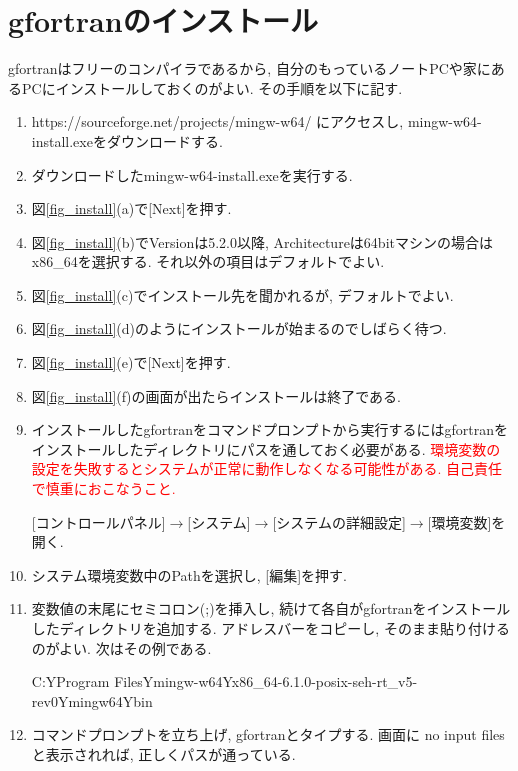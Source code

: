 \appendix
\section{gfortranのインストール}
gfortranはフリーのコンパイラであるから, 
自分のもっているノートPCや家にあるPCにインストールしておくのがよい. 
その手順を以下に記す. 

\begin{enumerate}
\item https://sourceforge.net/projects/mingw-w64/ にアクセスし, mingw-w64-install.exeをダウンロードする. 
\item ダウンロードしたmingw-w64-install.exeを実行する. 
\item 図\ref{fig_install}(a)で[Next]を押す. 
\item 図\ref{fig_install}(b)でVersionは5.2.0以降, Architectureは64bitマシンの場合はx86\_64を選択する. それ以外の項目はデフォルトでよい. 
\item 図\ref{fig_install}(c)でインストール先を聞かれるが, デフォルトでよい. 
\item 図\ref{fig_install}(d)のようにインストールが始まるのでしばらく待つ.  
\item 図\ref{fig_install}(e)で[Next]を押す. 
\item 図\ref{fig_install}(f)の画面が出たらインストールは終了である. 
\item インストールしたgfortranをコマンドプロンプトから実行するにはgfortranをインストールしたディレクトリにパスを通しておく必要がある.
\textcolor{red}{環境変数の設定を失敗するとシステムが正常に動作しなくなる可能性がある. 自己責任で慎重におこなうこと. }

[コントロールパネル]$\to$[システム]$\to$[システムの詳細設定]$\to$[環境変数]を開く. 
\item システム環境変数中のPathを選択し, [編集]を押す. 
\item 変数値の末尾にセミコロン(;)を挿入し, 続けて各自がgfortranをインストールしたディレクトリを追加する. 
アドレスバーをコピーし, そのまま貼り付けるのがよい. 次はその例である. 

C:Y\llap{=}Program FilesY\llap{=}mingw-w64Y\llap{=}x86\_64-6.1.0-posix-seh-rt\_v5-rev0Y\llap{=}mingw64Y\llap{=}bin

\item コマンドプロンプトを立ち上げ, gfortranとタイプする. 画面に no input files と表示されれば, 正しくパスが通っている. 
\end{enumerate}

